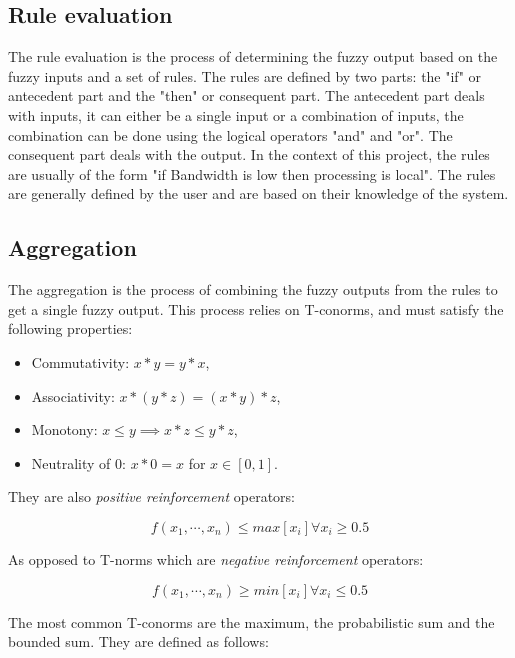 \subsection{Rule evaluation}
\label{subsec:fuzzy-rule-evaluation}

The rule evaluation is the process of determining the fuzzy output based on the fuzzy inputs and a set of rules. The
rules are defined by two parts: the "if" or antecedent part and the "then" or consequent part. The antecedent part
deals with inputs, it can either be a single input or a combination of inputs, the combination can be done using the
logical operators "and" and "or". The consequent part deals with the output. In the context of this project, the rules
are usually of the form "if Bandwidth is low then processing is local". The rules are generally defined by the user
and are based on their knowledge of the system.

\subsection{Aggregation}
\label{subsec:fuzzy-aggregation}

The aggregation is the process of combining the fuzzy outputs from the rules to get a single fuzzy output. This process
relies on T-conorms, and must satisfy the following properties:

\begin{itemize}
	\item Commutativity: $x * y = y * x$,
	\item Associativity: $x * (y * z) = (x * y) * z$,
	\item Monotony: $x \leq y \implies x * z \leq y * z$,
	\item Neutrality of 0: $x * 0 = x$ for $x \in [0, 1]$.
\end{itemize}

They are also \textit{positive reinforcement} operators:

\begin{equation}
	f(x_1, \cdots, x_n) \leq max[x_i] \forall x_i \geq 0.5
\end{equation}

As opposed to T-norms which are \textit{negative reinforcement} operators:

\begin{equation}
	f(x_1, \cdots, x_n) \geq min[x_i] \forall x_i \leq 0.5
\end{equation}

The most common T-conorms are the maximum, the probabilistic sum and the bounded sum. They are defined as follows:

